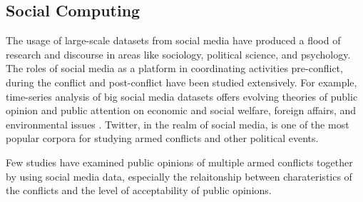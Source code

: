 \subsection{Social Computing}
The usage of large-scale datasets from social media have produced a flood of research and discourse in areas like sociology, political science, and psychology. The roles of social media as a platform in coordinating activities pre-conflict, during the conflict and post-conflict have been studied extensively. For example, time-series analysis of big social media datasets offers evolving theories of public opinion and public attention on economic and social welfare, foreign affairs, and environmental issues \cite{RussellNeuman2014}. Twitter, in the realm of social media, is one of the most popular corpora for studying armed conflicts and other political events. 

Few studies have examined public opinions of multiple armed conflicts together by using social media data, especially the relaitonship between charateristics of the conflicts and the level of acceptability of public opinions.
